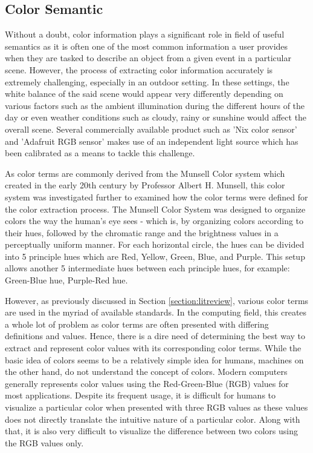 \subsection{Color Semantic}
\label{subsec:colorsemantics}

Without a doubt, color information plays a significant role in field of useful semantics as it is often one of the most common information a user provides when they are tasked to describe an object from a given event in a particular scene. However, the process of extracting color information accurately is extremely challenging, especially in an outdoor setting. In these settings, the white balance of the said scene would appear very differently depending on various factors such as the ambient illumination during the different hours of the day or even weather conditions such as cloudy, rainy or sunshine would affect the overall scene. Several commercially available product such as 'Nix color sensor' \cite{nixsensorltd} and 'Adafruit RGB sensor' \cite{adafruit} makes use of an independent light source which has been calibrated as a means to tackle this challenge.

As color terms are commonly derived from the Munsell Color system which created in the early 20th century by Professor Albert H. Munsell, this color system was investigated further to examined how the color terms were defined for the color extraction process. The Munsell Color System was designed to organize colors the way the human's eye sees - which is, by organizing colors according to their hues, followed by the chromatic range and the brightness values in a perceptually uniform manner. For each horizontal circle, the hues can be divided into 5 principle hues which are Red, Yellow, Green, Blue, and Purple. This setup allows another 5 intermediate hues between each principle hues, for example: Green-Blue hue, Purple-Red hue. 

However, as previously discussed in Section \ref{section:litreview}, various color terms are used in the myriad of available standards. In the computing field, this creates a whole lot of problem as color terms are often presented with differing definitions and values. Hence, there is a dire need of determining the best way to extract and represent color values with its corresponding color terms. While the basic idea of colors seems to be a relatively simple idea for humans, machines on the other hand, do not understand the concept of colors. Modern computers generally represents color values using the Red-Green-Blue (RGB) values for most applications. Despite its frequent usage, it is difficult for humans to visualize a particular color when presented with three RGB values as these values does not directly translate the intuitive nature of a particular color. Along with that, it is also very difficult to visualize the difference between two colors using the RGB values only. 


